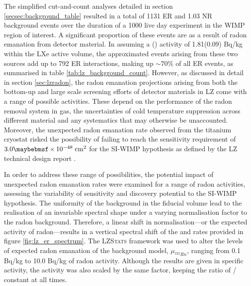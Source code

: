 {The simplified cut-and-count analyses detailed in section \ref{secsec:background_table} resulted in a total of 1131 ER and 1.03 NR background events over the duration of a 1000 live day experiment in the WIMP region of interest. A significant proportion of these events are as a result of radon emanation from detector material. In assuming a \RnTTT{}(\RnTTZ{}) activity of 1.81(0.09) \micro{}Bq/kg within the LXe active volume, the approximated events arising from these two sources add up to 792 ER interactions, making up $\sim70\%$ of all ER events, as summarised in table \ref{tab:lz_background_count}. However, as discussed in detail in section \ref{sec:lzradon}, the radon emanation projections arising from both the bottom-up and large scale screening efforts of detector materials in LZ come with a range of possible activities. These depend on the performance of the radon removal system in gas, the uncertainties of cold temperature suppression across different material and any systematics that may otherwise be unaccounted. Moreover, the unexpected radon emanation rate observed from the titanium cryostat risked the possibility of failing to reach the sensitivity requirement of $3.0 \times 10^{-48} \; \MathText{cm}^2$ for the SI-WIMP hypothesis as defined by the LZ technical design report \cite{lz_tdr}. 

In order to address these range of possibilities, the potential impact of unexpected radon emanation rates were examined for a range of radon activities, assessing the variability of sensitivity and discovery potential to the SI-WIMP hypothesis. The uniformity of the \RnTTT{} background in the fiducial volume lead to the realisation of an invariable spectral shape under a varying normalisation factor to the radon background. Therefore, a linear shift in normalisation---or the expected activity of radon---results in a vertical spectral shift of the \RnTTT{} and \RnTTZ{} rates provided in figure \ref{fig:lz_er_spectrum}. The \textsc{LZStats} framework was used to alter the levels of expected radon emanation of the background model, $\mu_{^{222}Rn}$, ranging from 0.1 \micro{}Bq/kg to 10.0 \micro{}Bq/kg of radon activity. Although the results are given in \RnTTT{} specific activity, the \RnTTZ{} activity was also scaled by the same factor, keeping the ratio of \RnTTT{}/\RnTTZ{} constant at all times. 

}
